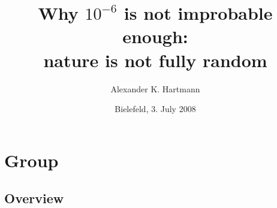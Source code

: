 \documentclass{beamer}
\title{Why $10^{-6}$ is not improbable enough:\\ 
nature is not fully  random}
\author{Alexander K. Hartmann}
\institute[University of Oldenburg] %
{
  Institute of  Physics\\
  University of Oldenburg
}
\date{Bielefeld, 3. July 2008}
\begin{document}
\begin{frame}
  \titlepage
\end{frame}

\logo{}  %

\section{Group}
\subsection{Overview}

\end{document}
